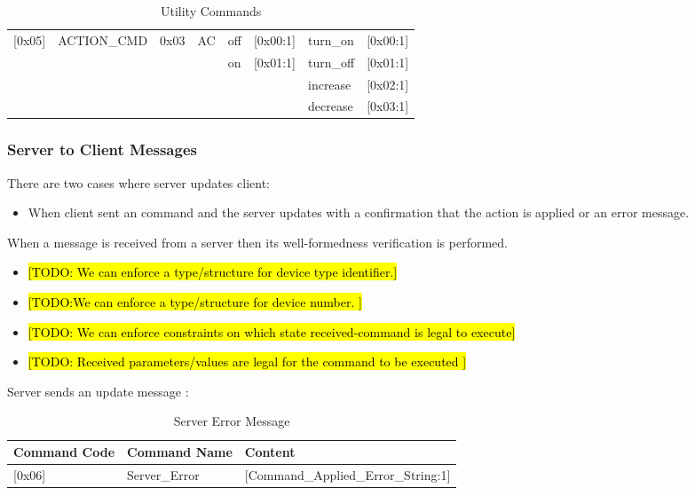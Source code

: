 \begin{table}[ht!]
{\begin{tabular}{l l l l l l l l}
\hline
\textsf{[0x05]} & \textsf{ACTION\_CMD}    &     \textsf{0x03}  & \textsf{AC}         &\textsf{off}      & \textsf{[0x00:1]}   & \textsf{turn\_on} & \textsf{[0x00:1]}  \\
                &                         &                    &                     &\textsf{on}       & \textsf{[0x01:1]}   & \textsf{turn\_off}  & \textsf{[0x01:1]} \\
                &                         &                    &                     &                  &                     & \textsf{increase}    & \textsf{[0x02:1]} \\
                &                         &                    &                     &                  &                     & \textsf{decrease}  & \textsf{[0x03:1]} \\
\hline
\hline
\end{tabular}}
\caption{Utility Commands}
\end{table}


\subsubsection{Server to Client Messages}
\label{sec:pdus:pdu:s_to_c}
There are two cases where server updates client:
\begin{itemize}
\item When client sent an command and the server updates with a confirmation that the action is applied or an error message.
  \end{itemize}

When a message is received from a server then its well-formedness verification is performed.
\begin{itemize}
\item \hl{[TODO: We can enforce a type/structure for device type identifier.]}
\item \hl{[TODO:We can enforce a type/structure for device number. ]}
\item \hl{[TODO: We can enforce constraints on which state received-command is legal to execute]}
  \item \hl{[TODO: Received parameters/values are legal for the command to be executed ]}
\end{itemize}

Server sends an update message :

\begin{table}[ht!]
  \centering
  \begin{tabular}{l l l}
\hline
\textbf{Command Code} & \textbf{Command Name} & \textbf{Content}\\
\hline
\hline
\textsf{[0x06]} & \textsf{Server\_Error}  &     \textsf{[Command\_Applied\_Error\_String:1]} \\
\hline
\hline
\end{tabular}
\caption{Server Error Message}
\end{table}


